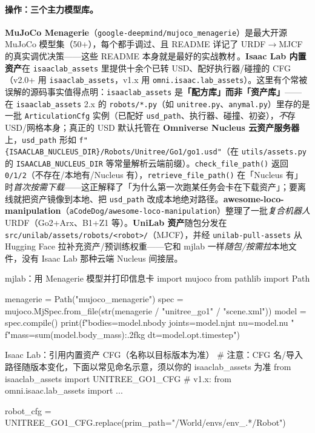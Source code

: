 \paragraph{操作：三个主力模型库。}\textbf{MuJoCo Menagerie}（\texttt{google-deepmind/mujoco\_menagerie}）是最大开源 MuJoCo 模型集（50+），每个都手调过、且 README 详记了 URDF$\to$MJCF 的真实调优决策——这些 README 本身就是最好的实战教材\,\cite{menagerie2022}。\textbf{Isaac Lab 内置资产}在 \texttt{isaaclab\_assets} 里提供十余个已转 USD、配好执行器/碰撞的 CFG（v2.0+ 用 \texttt{isaaclab\_assets}，v1.x 用 \texttt{omni.isaac.lab\_assets}）。这里有个常被误解的源码事实值得点明：\texttt{isaaclab\_assets} 是\textbf{「配方库」而非「资产库」}——在 \texttt{isaaclab\_assets} 2.x 的 \texttt{robots/*.py}（如 \texttt{unitree.py}、\texttt{anymal.py}）里存的是一批 \texttt{ArticulationCfg} 实例（已配好 \texttt{usd\_path}、执行器、碰撞、初姿），\emph{不}存 USD/网格本身；真正的 USD 默认托管在 \textbf{Omniverse Nucleus 云资产服务器}上，\texttt{usd\_path} 形如 \verb|f"{ISAACLAB_NUCLEUS_DIR}/Robots/Unitree/Go1/go1.usd"|（在 \texttt{utils/assets.py} 的 \texttt{ISAACLAB\_NUCLEUS\_DIR} 等常量解析云端前缀）。\texttt{check\_file\_path()} 返回 \texttt{0/1/2}（不存在/本地有/Nucleus 有），\texttt{retrieve\_file\_path()} 在「Nucleus 有」时\emph{首次按需下载}——这正解释了「为什么第一次跑某任务会卡在下载资产」；要离线就把资产镜像到本地、把 \texttt{usd\_path} 改成本地绝对路径。\textbf{awesome-loco-manipulation}（\texttt{aCodeDog/awesome-loco-manipulation}）整理了一批\emph{复合机器人} URDF（Go2+Arx、B1+Z1 等）。\textbf{UniLab 资产}随包分发在 \verb|src/unilab/assets/robots/<robot>/|（MJCF），并经 \texttt{unilab-pull-assets} 从 Hugging Face 拉补充资产/预训练权重——它和 mjlab 一样\emph{随包/按需拉}本地文件，没有 Isaac Lab 那种云端 Nucleus 间接层。

\begin{codebox}[Python]{mjlab：用 Menagerie 模型并打印信息卡}
import mujoco
from pathlib import Path

menagerie = Path("mujoco_menagerie")
spec = mujoco.MjSpec.from_file(str(menagerie / "unitree_go1" / "scene.xml"))
model = spec.compile()
print(f"bodies={model.nbody} joints={model.njnt} nu={model.nu} "
      f"mass={sum(model.body_mass):.2f}kg dt={model.opt.timestep}")
\end{codebox}

\begin{codebox}[Python]{Isaac Lab：引用内置资产 CFG（名称以目标版本为准）}
# 注意：CFG 名/导入路径随版本变化，下面以常见命名示意，须以你的 isaaclab_assets 为准
from isaaclab_assets import UNITREE_GO1_CFG   # v1.x: from omni.isaac.lab_assets import ...

robot_cfg = UNITREE_GO1_CFG.replace(prim_path="/World/envs/env_.*/Robot")
\end{codebox}


